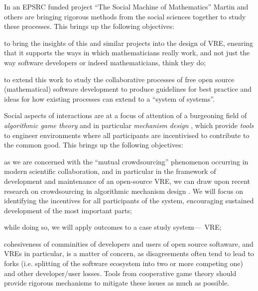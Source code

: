 \begin{workpackage}[id=social-aspects,wphases=0-48,
  title=Social Aspects,
  lead=UO,
  UORM=27,USHRM=8, USORM=6]
\begin{wpobjectives}
In an EPSRC funded project ``The Social Machine of Mathematics''
Martin and others are bringing rigorous methods from the social 
sciences together to study these processes. This brings up the following
objectives: 
\begin{compactitem}
\item to bring the insights of this and similar projects into the
  design of \TheProject VRE, ensuring that it supports the ways in
  which mathematicians really work, and not just the way software
  developers or indeed mathematicians, think they do;
\item to extend this work to study the collaborative processes of
  free open source
  (mathematical) software development to produce guidelines for best
  practice and ideas for how existing processes can extend to a
  ``system of systems''.
\end{compactitem} 


Social aspects of interactions are at a focus of attention
of a burgeoning field of \emph{algorithmic game theory} and 
in particular \emph{mechanism design} \cite{AGTbook}, which provide \emph{tools} to engineer 
environments where all participants are incentivised to contribute to the common good.
This brings up the following objectives:
\begin{compactitem}
\item as we are concerned with the ``mutual
crowdsourcing'' phenomenon occurring in modern scientific collaboration, and in particular 
in the framework of development and maintenance of an open-source VRE,   
we can draw upon recent research on crowdsourcing in algorithmic
mechanism design \cite{crowds}.
We will focus on identifying the incentives for all participants of the
system, encouraging sustained development of the most
important parts;
\item while doing so, we will apply outcomes to a case study system---\TheProject\ VRE;  
\item cohesiveness of comminities of developers and users of open source softaware, and
VREs in particular, is a matter of concern, as disagreements often tend to lead to
forks (i.e. splitting of the software ecosystem into two or more competing one) and
other developer/user losses. Tools from
cooperative game theory  should provide rigorous mechanisms to mitigate these
issues as much as possible. 
\end{compactitem}


\end{wpobjectives}
\end{workpackage}
